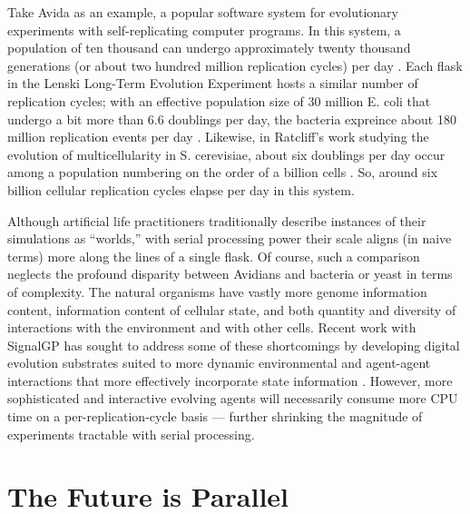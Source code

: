 Take Avida as an example, a popular software system for evolutionary experiments with self-replicating computer programs.
In this system, a population of ten thousand can undergo approximately twenty thousand generations (or about two hundred million replication cycles) per day \citep{ofria2009artificial}.
Each flask in the Lenski Long-Term Evolution Experiment hosts a similar number of replication cycles; with an effective population size of 30 million E. coli that undergo a bit more than 6.6 doublings per day, the bacteria expreince about 180 million replication events per day \citep{good2017dynamics}.
Likewise, in Ratcliff’s work studying the evolution of multicellularity in S. cerevisiae, about six doublings per day occur among a population numbering on the order of a billion cells \citep{ratcliff2012experimental}.
So, around six billion cellular replication cycles elapse per day in this system.

Although artificial life practitioners traditionally describe instances of their simulations as ``worlds,'' with serial processing power their scale aligns (in naive terms) more along the lines of a single flask.
Of course, such a comparison neglects the profound disparity between Avidians and bacteria or yeast in terms of complexity.
The natural organisms have vastly more genome information content, information content of cellular state, and both quantity and diversity of interactions with the environment and with other cells.
Recent work with SignalGP has sought to address some of these shortcomings by developing digital evolution substrates suited to more dynamic environmental and agent-agent interactions \citep{lalejini2018evolving} that more effectively incorporate state information \citep{lalejini2021tag,lalejini2020case, moreno2019evaluating}.
However, more sophisticated and interactive evolving agents will necessarily consume more CPU time on a per-replication-cycle basis --- further shrinking the magnitude of experiments tractable with serial processing.

\section{The Future is Parallel}


